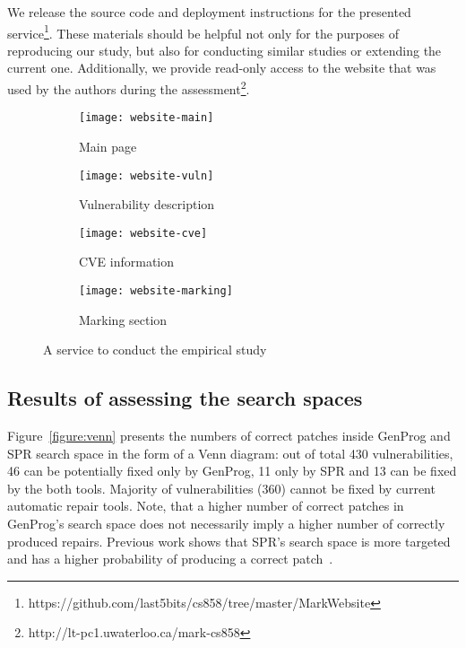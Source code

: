 We release the source code and deployment instructions for the presented service\footnote{https://github.com/last5bits/cs858/tree/master/MarkWebsite}.
These materials should be helpful not only for the purposes of reproducing our study, but also for conducting similar studies or extending the current one. Additionally, we provide read-only access to the website that was used by the authors during the assessment\footnote{http://lt-pc1.uwaterloo.ca/mark-cs858}.

\begin{figure}[t!]

\begin{subfigure}[b]{\linewidth}
    \texttt{[image: website-main]}
    \caption{Main page}
    \label{figure:website-main}
\end{subfigure}

\begin{subfigure}[b]{\linewidth}
    \texttt{[image: website-vuln]}
    \caption{Vulnerability description}
    \label{figure:website-vuln}
\end{subfigure}

\begin{subfigure}[b]{\linewidth}
    \texttt{[image: website-cve]}
    \caption{CVE information}
    \label{figure:website-cve}
\end{subfigure}

\begin{subfigure}[b]{\linewidth}
    \texttt{[image: website-marking]}
    \caption{Marking section}
    \label{figure:website-marking}
\end{subfigure}

\caption{A service to conduct the empirical study}
\label{figure:website}
\end{figure}

\subsection{Results of assessing the search spaces}

Figure~\ref{figure:venn} presents the numbers of correct patches inside GenProg and SPR search space in the form of a Venn diagram: out of total 430 vulnerabilities, 46 can be potentially fixed only by GenProg, 11 only by SPR and 13 can be fixed by the both tools.
Majority of vulnerabilities (360) cannot be fixed by current automatic repair tools.
Note, that a higher number of correct patches in GenProg's search space does not necessarily imply a higher number of correctly produced repairs. Previous work shows that SPR's search space is more targeted and has a higher probability of producing a correct patch~\cite{long2015staged}.

